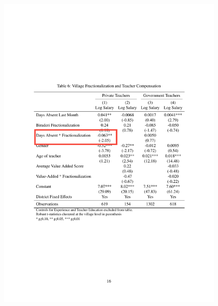\documentclass{beamer}
\begin{document}
\begin{frame}{}
\begin{figure}[htb]
	\begin{center}
	\includegraphics[scale=0.65]{tables/frac_and_compensation_box1.pdf}
	\end{center}
\end{figure}
\end{frame}
\end{document}
